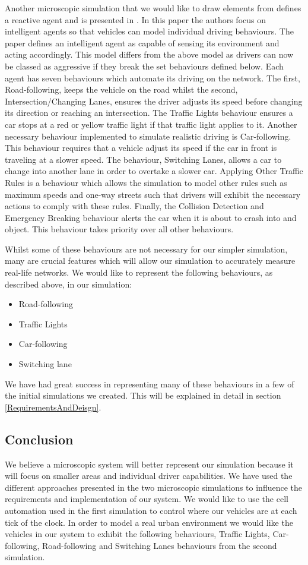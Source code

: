 \documentclass{article}
\begin{document}
	Another microscopic simulation that we would like to draw elements from defines a reactive agent and is presented in \cite{ehlert2001microscopic}. In this paper the authors focus on intelligent agents so that vehicles can model individual driving behaviours. The paper defines an intelligent agent as capable of sensing its environment and acting accordingly. This model differs from the above model as drivers can now be classed as aggressive if they break the set behaviours defined below. Each agent has seven behaviours which automate its driving on the network. The first, Road-following, keeps the vehicle on the road whilst the second, Intersection/Changing Lanes, ensures the driver adjusts its speed before changing its direction or reaching an intersection. The Traffic Lights behaviour ensures a car stops at a red or yellow traffic light if that traffic light applies to it.  Another necessary behaviour implemented to simulate realistic driving is Car-following. This behaviour requires that a vehicle adjust its speed if the car in front is traveling at a slower speed. The behaviour, Switching Lanes, allows a car to change into another lane in order to overtake a slower car. Applying Other Traffic Rules is a behaviour which allows the simulation to model other rules such as maximum speeds and one-way streets such that drivers will exhibit the necessary actions to comply with these rules. Finally, the Collision Detection and Emergency Breaking behaviour alerts the car when it is about to crash into and object. This behaviour takes priority over all other behaviours. 
	
	Whilst some of these behaviours are not necessary for our simpler simulation, many are crucial features which will allow our simulation to accurately measure real-life networks. We would like to represent the following behaviours, as described above, in our simulation: 
	\begin{itemize}
		\item Road-following
		\item Traffic Lights
		\item Car-following
		\item Switching lane
	\end{itemize}
	 We have had great success in representing many of these behaviours in a few of the initial simulations we created. This will be explained in detail in section \ref{RequirementsAndDeisgn}. 
	
	
	\subsection{Conclusion}
	We believe a microscopic system will better represent our simulation because it will focus on smaller areas and individual driver capabilities. 
	We have used the different approaches presented in the two microscopic simulations to influence the requirements and implementation of our system. We would like to use the cell automation used in the first simulation to control where our vehicles are at each tick of the clock. In order to model a real urban environment we would like the vehicles in our system to exhibit the following behaviours, Traffic Lights, Car-following, Road-following and Switching Lanes behaviours from the second simulation.
	
\end{document}
